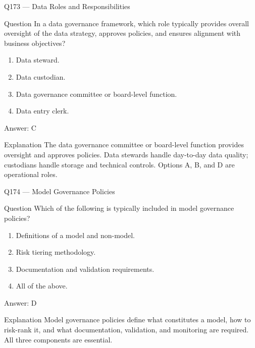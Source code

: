 \documentclass[aspectratio=169,8pt]{beamer}
\begin{document}
\begin{frame}{Q173 --- Data Roles and Responsibilities}
\begin{block}{Question}
In a data governance framework, which role typically provides overall oversight of the data strategy, approves policies, and ensures alignment with business objectives?
\begin{enumerate}
\item Data steward.
\item Data custodian.
\item Data governance committee or board-level function.
\item Data entry clerk.
\end{enumerate}  \end{block}
\begin{exampleblock}{Answer: C}\end{exampleblock}
\begin{block}{Explanation}
The data governance committee or board-level function provides oversight and approves policies. Data stewards handle day-to-day data quality; custodians handle storage and technical controls. Options A, B, and D are operational roles.
\end{block}
\end{frame}

\begin{frame}{Q174 --- Model Governance Policies}
\begin{block}{Question}
Which of the following is typically included in model governance policies?
\begin{enumerate}
\item Definitions of a model and non-model.
\item Risk tiering methodology.
\item Documentation and validation requirements.
\item All of the above.
\end{enumerate}  \end{block}
\begin{exampleblock}{Answer: D}\end{exampleblock}
\begin{block}{Explanation}
Model governance policies define what constitutes a model, how to risk-rank it, and what documentation, validation, and monitoring are required. All three components are essential.
\end{block}
\end{frame}
\end{document}
